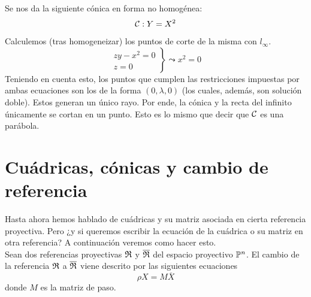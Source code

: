 \begin{exa}[Parábola]
	Se nos da la siguiente cónica en forma no homogénea:
	\[\mathcal{C}:Y=X^2\]
	Calculemos (tras homogeneizar) los puntos de corte de la misma con $l_\infty$.
	\[\left.\begin{array}{c}
	zy-x^2=0\\
	z=0
	\end{array}\right\}\leadsto x^2=0\]
	Teniendo en cuenta esto, los puntos que cumplen las restricciones impuestas por ambas ecuaciones son los de la forma $(0,\lambda,0)$ (los cuales, además, son solución doble). Estos generan un único rayo. Por ende, la cónica y la recta del infinito únicamente se cortan en un punto. Esto es lo mismo que decir que $\mathcal{C}$ es una parábola.
\end{exa}

\section{Cuádricas, cónicas y cambio de referencia}
Hasta ahora hemos hablado de cuádricas y su matriz asociada en cierta referencia proyectiva. Pero ¿y si queremos escribir la ecuación de la cuádrica o su matriz en otra referencia? A continuación veremos como hacer esto.\\

Sean dos referencias proyectivas $\mathfrak{R}$ y $\overline{\mathfrak{R}}$ del espacio proyectivo $\mathbb{P}^n$. El cambio de la referencia $\mathfrak{R}$ a $\overline{\mathfrak{R}}$ viene descrito por las siguientes ecuaciones
\begin{equation}
\rho X=M\overline{X}
\end{equation}
donde $M$ es la matriz de paso. 

